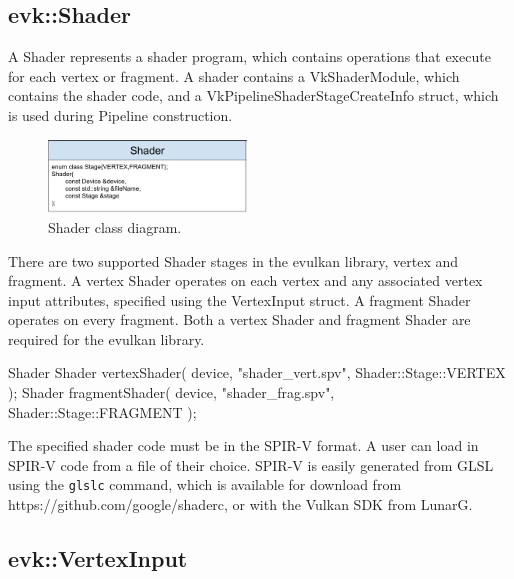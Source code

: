 \documentclass[12pt]{report}
\newcommand{\figurewidth}{0.55\textwidth}
\newcommand{\imagewidth}{0.47\textwidth}
\theoremstyle{definition}
\begin{document}
      \subsection{evk::Shader}

        A Shader represents a shader program, which contains operations that
        execute for each vertex or fragment. A shader contains a
        VkShaderModule, which contains the shader code, and a
        VkPipelineShaderStageCreateInfo struct, which is used during
        Pipeline construction.

        \begin{figure}
          \centering
          \includegraphics[width=\imagewidth]{images/class_shader.png}
          \caption{Shader class diagram.}
          \label{fig:class_shader}
        \end{figure}

        There are two supported Shader stages in the evulkan library, vertex and fragment. A
        vertex Shader operates on each vertex and any associated vertex
        input attributes, specified using the VertexInput struct. A
        fragment Shader operates on every fragment. Both a vertex Shader
        and fragment Shader are required for the evulkan library.

        \begin{usage}{Shader}
  Shader vertexShader(
    device, "shader_vert.spv", Shader::Stage::VERTEX
  );
  Shader fragmentShader(
    device, "shader_frag.spv", Shader::Stage::FRAGMENT
  );
        \end{usage}

        The specified shader code must be in the SPIR-V format. 
        A user can load in SPIR-V code from a file of their choice. SPIR-V is
        easily generated from GLSL using the \texttt{glslc} command, which is
        available for download from https://github.com/google/shaderc, or
        with the Vulkan SDK from LunarG.

      \subsection{evk::VertexInput}
\end{document}
